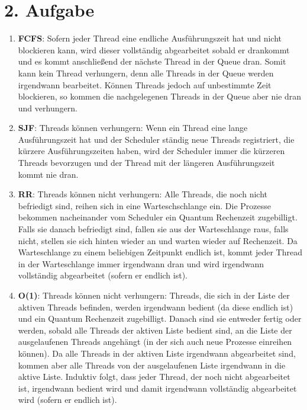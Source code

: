 \documentclass[numbers=noendperiod,10pt]{scrartcl}
\begin{document}
\section*{2. Aufgabe}

\begin{enumerate}
	\item \textbf{FCFS}: Sofern jeder Thread eine endliche Ausführungszeit hat und nicht blockieren kann, wird dieser vollständig abgearbeitet sobald er drankommt und es kommt anschließend der nächste Thread in der Queue dran. Somit kann kein Thread verhungern, denn alle Threads in der Queue werden irgendwann bearbeitet. Können Threads jedoch auf unbestimmte Zeit blockieren, so kommen die nachgelegenen Threads in der Queue aber nie dran und verhungern.
	
	\item \textbf{SJF}: Threads können verhungern: Wenn ein Thread eine lange Ausführungszeit hat und der Scheduler ständig neue Threads registriert, die kürzere Ausführungszeiten haben, wird der Scheduler immer die kürzeren Threads bevorzugen und der Thread mit der längeren Ausführungszeit kommt nie dran.
	
	\item \textbf{RR}: Threads können nicht verhungern: Alle Threads, die noch nicht befriedigt sind, reihen sich in eine Warteschschlange ein. Die Prozesse bekommen nacheinander vom Scheduler ein Quantum Rechenzeit zugebilligt. Falls sie danach befriedigt sind, fallen sie aus der Warteschlange raus, falls nicht, stellen sie sich hinten wieder an und warten wieder auf Rechenzeit. Da Warteschlange zu einem beliebigen Zeitpunkt endlich ist, kommt jeder Thread in der Warteschlange immer irgendwann dran und wird irgendwann vollständig abgearbeitet (sofern er endlich ist).
	
	\item \textbf{O(1)}: Threads können nicht verhungern: Threads, die sich in der Liste der aktiven Threads befinden, werden irgendwann bedient (da diese endlich ist) und ein Quantum Rechenzeit zugebilligt. Danach sind sie entweder fertig oder werden, sobald alle Threads der aktiven Liste bedient sind, an die Liste der ausgelaufenen Threads angehängt (in der sich auch neue Prozesse einreihen können). Da alle Threads in der aktiven Liste irgendwann abgearbeitet sind, kommen aber alle Threads von der ausgelaufenen Liste irgendwann in die aktive Liste. Induktiv folgt, dass jeder Thread, der noch nicht abgearbeitet ist, irgendwann bedient wird und damit irgendwann vollständig abgearbeitet wird (sofern er endlich ist).
	

\end{enumerate}
\end{document}
